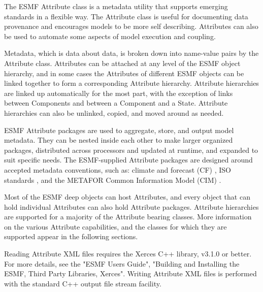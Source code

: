 %


The ESMF Attribute class is a metadata utility that supports emerging standards 
in a flexible way.  The Attribute class is useful for documenting data 
provenance and encourages models to be more self describing.  Attributes can 
also be used to automate some aspects of model execution and coupling.

Metadata, which is data about data, is broken down into 
name-value pairs by the Attribute class.  Attributes can be attached at any 
level of the ESMF object hierarchy, and in some cases the Attributes of 
different ESMF objects can be linked together to form 
a corresponding Attribute hierarchy.  Attribute hierarchies are linked up
automatically for the most part, with the exception of links between Components 
and between a Component and a State.  Attribute hierarchies can also be 
unlinked, copied, and moved around as needed.

ESMF Attribute packages 
are used to aggregate, store, and output model metadata.  They can be 
nested inside each other to make larger organized packages, distributed across 
processors and updated at runtime, and expanded to suit specific needs.  The
ESMF-supplied  
Attribute packages are designed around accepted metadata conventions, such as: 
climate and forecast (CF) \cite{ref:cf}, ISO standards \cite{ref:iso}, and the METAFOR Common Information Model (CIM) \cite{ref:cim} \cite{ref:esdoccim}.

Most of the ESMF deep objects can host Attributes, and   
every object that can hold individual Attributes can also hold
Attribute packages.  Attribute hierarchies are supported for a majority of
the Attribute bearing classes.  
More information on the various Attribute 
capabilities, and the classes for which they are supported appear in the
following sections.

Reading Attribute XML files requires the Xerces C++ library, v3.1.0 
or better.  For more details, see the "ESMF Users Guide", "Building and 
Installing the ESMF, Third Party Libraries, Xerces".  Writing Attribute XML 
files is performed with the standard C++ output file stream facility.

